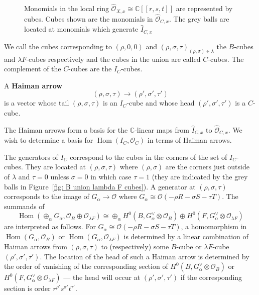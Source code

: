 \documentclass[12pt]{amsart}
\theoremstyle{definition}
\newcommand{\CC} {\mathbb{C}}          %
\renewcommand{\O}{\mathcal{O}}
\newcommand{\Hom}{\operatorname{Hom}}
\renewcommand{\hat}{\widehat}
\begin{document}
\begin{figure}

\caption{Monomials in the local ring
$\widehat{\O}_{X,x} \cong \CC [[r,s,t]]$ are represented by
cubes. Cubes shown are the monomials in
$\widehat{\O}_{C,x}$. The grey balls are located at monomials which
generate $\hat{I}_{C,x}$ }\label{fig: B union lambda F cubes}
\end{figure}

We call the cubes corresponding to $(\rho ,0,0)$ and $(\rho ,\sigma
,\tau )_{(\rho ,\sigma )\in \lambda}$ the $B$-cubes and $\lambda
F$-cubes respectively and the cubes in the union are called
$C$-cubes. The complement of the $C$-cubes are the $I_{C}$-cubes.

A \textbf{Haiman arrow} 
\[
(\rho ,\sigma ,\tau )\to (\rho ',\sigma ',\tau ')
\]
is a vector whose tail $(\rho ,\sigma ,\tau )$ is an $I_{C}$-cube and
whose head $(\rho ',\sigma ',\tau ')$ is a $C$-cube.

The Haiman arrows form a basis for the $\CC$-linear maps from
$\widehat{I}_{C,x}$ to $\hat{\O}_{C,x}$. We wish to determine a basis
for $\Hom (I_{C},\O_{C})$ in terms of Haiman arrows.

The generators of $I_{C}$ correspond to the cubes in the corners of
the set of $I_{C}$-cubes. They are located at $(\rho ,\sigma ,\tau )$
where $(\rho ,\sigma )$ are the corners just outside of $\lambda$ and
$\tau =0$ unless $\sigma =0$ in which case $\tau =1$ (they are
indicated by the grey balls in Figure~\ref{fig: B union lambda F
cubes}). A generator at $(\rho ,\sigma ,\tau )$ corresponds to the
image of $G_{\alpha}\to \O$ where $G_{\alpha}\cong \O (-\rho R-\sigma
S-\tau T)$. The summands of
\[
\Hom (\oplus_{\alpha}G_{\alpha},\O_{B}\oplus \O_{\lambda F}) \cong
\oplus_{\alpha} H^{0}(B,G_{\alpha}^{\vee}\otimes \O_{B})\oplus
H^{0}(F,G_{\alpha}^{\vee}\otimes \O_{\lambda F})
\]
are interpreted as follows. For $G_{\alpha}\cong \O (-\rho R-\sigma
S-\tau T)$, a homomorphism in $\Hom (G_{\alpha},\O_{B})$ or $\Hom
(G_{\alpha},\O_{\lambda F})$ is determined by a linear combination of
Haiman arrows from $(\rho ,\sigma ,\tau )$ to (respectively) some
$B$-cube or $\lambda F$-cube $(\rho ',\sigma ',\tau ').$ The location
of the head of such a Haiman arrow is determined by the order of
vanishing of the corresponding section of
$H^{0}(B,G_{\alpha}^{\vee}\otimes \O_{B})$ or
$H^{0}(F,G_{\alpha}^{\vee}\otimes \O_{\lambda F})$ --- the head will
occur at $(\rho ',\sigma ',\tau ')$ if the corresponding section is
order $r^{\rho '}s^{\sigma '}t^{\tau '}$.
\end{document}
